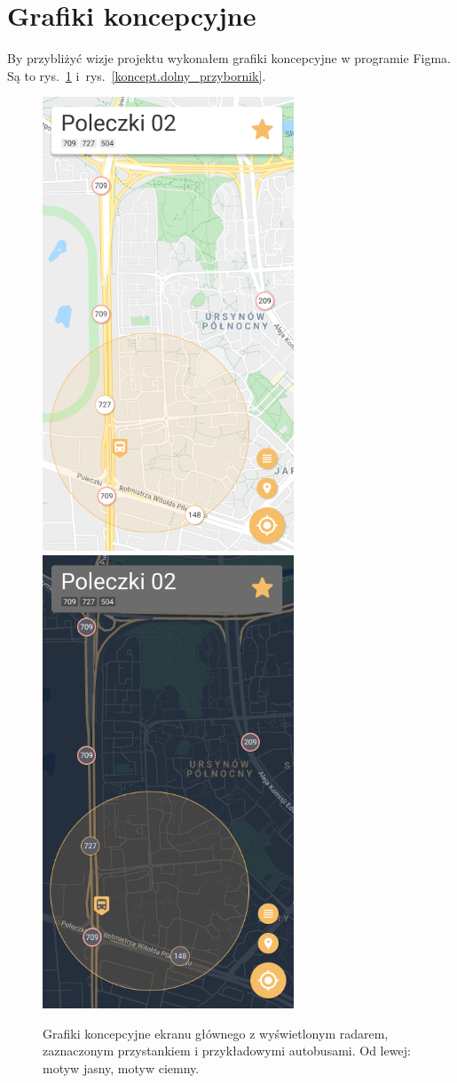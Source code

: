 \documentclass{SGGW-thesis}
\begin{document}
\section{Grafiki koncepcyjne}
By przybliżyć wizje projektu wykonałem grafiki koncepcyjne w programie Figma.
Są to rys.~\ref{koncept.ekran_glowny} i~rys.~\ref{koncept.dolny_przybornik}.
\begin{figure}[!htb]
  \centering
  \includegraphics[width=75mm]{koncepty/screen_day_click_stop}
  \enspace
  \includegraphics[width=75mm]{koncepty/screen_night_click_stop}
  \caption[Ekran główny - koncept]{
    \label{koncept.ekran_glowny}
    Grafiki koncepcyjne ekranu głównego z wyświetlonym radarem, zaznaczonym przystankiem i przykładowymi autobusami. Od lewej: motyw jasny, motyw ciemny. \vspace{2ex}
  }
\end{figure}
\end{document}
